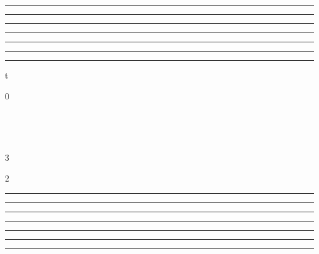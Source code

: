 \documentclass[]{article}
\begin{document}
\begin{center}\rule{3in}{0.4pt}\end{center}

\begin{center}\rule{3in}{0.4pt}\end{center}

\begin{center}\rule{3in}{0.4pt}\end{center}

\begin{center}\rule{3in}{0.4pt}\end{center}

\begin{center}\rule{3in}{0.4pt}\end{center}

\begin{center}\rule{3in}{0.4pt}\end{center}

\begin{center}\rule{3in}{0.4pt}\end{center}

t

0

 \pi~ 

\pi~

 3\pi~ 

2\pi~

\begin{center}\rule{3in}{0.4pt}\end{center}

\begin{center}\rule{3in}{0.4pt}\end{center}

\begin{center}\rule{3in}{0.4pt}\end{center}

\begin{center}\rule{3in}{0.4pt}\end{center}

\begin{center}\rule{3in}{0.4pt}\end{center}

\begin{center}\rule{3in}{0.4pt}\end{center}

\begin{center}\rule{3in}{0.4pt}\end{center}
\end{document}
